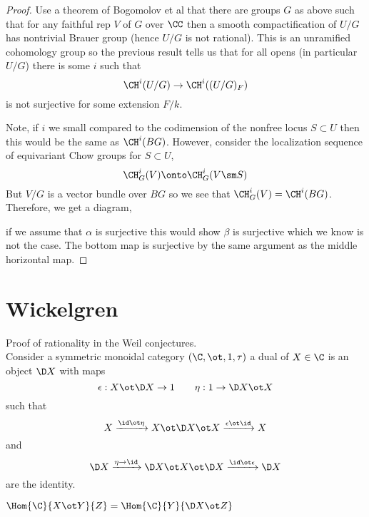 \documentclass{article}
\begin{document}
\begin{proof}
Use a theorem of Bogomolov et al that there are groups $G$ as above such that for any faithful rep $V$ of $G$ over $\CC$ then a smooth compactification of $U/G$ has nontrivial Brauer group (hence $U/G$ is not rational). This is an unramified cohomology group so the previous result tells us that for all opens (in particular $U/G$) there is some $i$ such that
\[ \CH^i(U/G) \to \CH^i((U/G)_F) \]
is not surjective for some extension $F / k$. 
\par 
Note, if $i$ we small compared to the codimension of the nonfree locus $S \subset U$ then this would be the same as $\CH^i(BG)$. However, consider the localization sequence of equivariant Chow groups for $S \subset U$,
\[ \CH_G^i(V) \onto \CH_G^i(V \sm S) \]
But $V/G$ is a vector bundle over $BG$ so we see that $\CH_G^i(V) = \CH^i(BG)$. Therefore, we get a diagram,
\begin{center}
\end{center}
if we assume that $\alpha$ is surjective this would show $\beta$ is surjective which we know is not the case. The bottom map is surjective by the same argument as the middle horizontal map.
\end{proof}

\section{Wickelgren}

Proof of rationality in the Weil conjectures. 
\bigskip\\
Consider a symmetric monoidal category $(\C, \ot, 1, \tau)$ a dual of $X \in \C$ is an object $\D X$ with maps
\[ \epsilon : X \ot \D X \to 1 \quad \quad \eta : 1 \to \D X \ot X \]
such that
\[ X \xrightarrow{\id \ot \eta} X \ot \D X \ot X \xrightarrow{\epsilon \ot \id} X \]
and 
\[ \D X \xrightarrow{\eta \to \id} \D X \ot X \ot \D X \xrightarrow{\id \ot \epsilon} \D X \]
are the identity. 

\begin{example}
$\Hom{\C}{X \ot Y}{Z} = \Hom{\C}{Y}{\D X \ot Z}$
\end{example}
\end{document}
